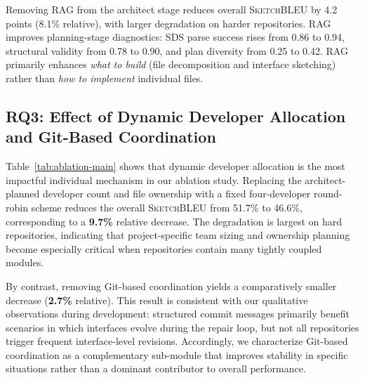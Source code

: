 \documentclass[format=acmsmall, review=false, screen=true]{acmart}
\newcommand{\sketchbleu}{\textsc{SketchBLEU}\xspace}
\begin{document}
\begin{rqsummary}[RQ2 Summary]
Removing RAG from the architect stage reduces overall \sketchbleu by 4.2 points (8.1\% relative), with larger degradation on harder repositories. RAG improves planning-stage diagnostics: SDS parse success rises from 0.86 to 0.94, structural validity from 0.78 to 0.90, and plan diversity from 0.25 to 0.42. RAG primarily enhances \emph{what to build} (file decomposition and interface sketching) rather than \emph{how to implement} individual files.
\end{rqsummary}

\subsection{RQ3: Effect of Dynamic Developer Allocation and Git-Based Coordination}
\label{subsec:rq3}

Table~\ref{tab:ablation-main} shows that dynamic developer allocation is the most impactful individual mechanism in our ablation study.
Replacing the architect-planned developer count and file ownership with a fixed four-developer round-robin scheme reduces the overall \sketchbleu from 51.7\% to 46.6\%, corresponding to a \textbf{9.7\%} relative decrease.
The degradation is largest on hard repositories, indicating that project-specific team sizing and ownership planning become especially critical when repositories contain many tightly coupled modules.

By contrast, removing Git-based coordination yields a comparatively smaller decrease (\textbf{2.7\%} relative).
This result is consistent with our qualitative observations during development: structured commit messages primarily benefit scenarios in which interfaces evolve during the repair loop, but not all repositories trigger frequent interface-level revisions.
Accordingly, we characterize Git-based coordination as a complementary sub-module that improves stability in specific situations rather than a dominant contributor to overall performance.
\end{document}
